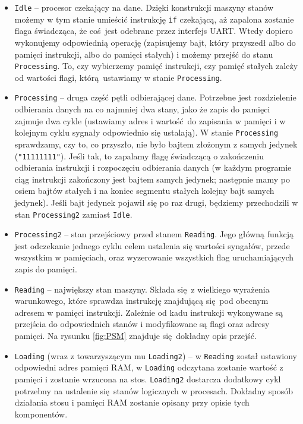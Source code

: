\begin{itemize}
  \item \texttt{Idle} -- procesor czekający na dane. Dzięki konstrukcji maszyny stanów możemy w tym stanie umieścić instrukcję \texttt{if} czekającą, aż zapalona zostanie flaga świadcząca, że coś jest odebrane przez interfejs UART. Wtedy dopiero wykonujemy odpowiednią operację (zapisujemy bajt, który przyszedł albo do pamięci instrukcji, albo do pamięci stałych) i możemy przejść do stanu \texttt{Processing}. To, czy wybierzemy pamięć instrukcji, czy pamięć stałych zależy od wartości flagi, którą ustawiamy w stanie \texttt{Processing}.
  \item \texttt{Processing} -- druga część pętli odbierającej dane. Potrzebne jest rozdzielenie odbierania danych na co najmniej dwa stany, jako że zapis do pamięci zajmuje dwa cykle (ustawiamy adres i wartość do zapisania w pamięci i w kolejnym cyklu sygnały odpowiednio się ustalają). W stanie \texttt{Processing} sprawdzamy, czy to, co przyszło, nie było bajtem złożonym z samych jedynek (\texttt{"11111111"}). Jeśli tak, to zapalamy flagę świadczącą o zakończeniu odbierania instrukcji i rozpoczęciu odbierania danych (w każdym programie ciąg instrukcji zakończony jest bajtem samych jedynek; następnie mamy po osiem bajtów stałych i na koniec segmentu stałych kolejny bajt samych jedynek). Jeśli bajt jedynek pojawił się po raz drugi, będziemy przechodzili w stan \texttt{Processing2} zamiast \texttt{Idle}.
  \item \texttt{Processing2} -- stan przejściowy przed stanem \texttt{Reading}. Jego główną funkcją jest odczekanie jednego cyklu celem ustalenia się wartości syngałów, przede wszystkim w pamięciach, oraz wyzerowanie wszystkich flag uruchamiających zapis do pamięci.
  \item \texttt{Reading} -- największy stan maszyny. Składa się z wielkiego wyrażenia warunkowego, które sprawdza instrukcję znajdującą się pod obecnym adresem w pamięci instrukcji. Zależnie od kadu instrukcji wykonywane są przejścia do odpowiednich stanów i modyfikowane są flagi oraz adresy pamięci. Na rysunku \ref{fig:PSM} znajduje się dokładny opis przejść.
  \item \texttt{Loading} (wraz z towarzyszącym mu \texttt{Loading2}) -- w \texttt{Reading} został ustawiony odpowiedni adres pamięci RAM, w \texttt{Loading} odczytana zostanie wartość z pamięci i zostanie wrzucona na stos. \texttt{Loading2} dostarcza dodatkowy cykl potrzebny na ustalenie się stanów logicznych w procesach. Dokładny sposób działania stosu i pamięci RAM zostanie opisany przy opisie tych komponentów.

\end{itemize}
